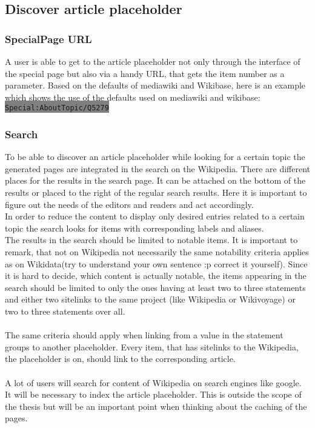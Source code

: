\documentclass[11pt]{article}
\begin{document}
  \subsection{Discover article placeholder}
  \subsubsection{SpecialPage URL}
  A user is able to get to the article placeholder not only through the interface of the special page but also via a handy URL, that gets the item number as a parameter. Based on the defaults of mediawiki and Wikibase, here is an example which shows the use of the defaults used on mediawiki and wikibase: \colorbox{Gray}{\lstinline[basicstyle=\ttfamily\color{white}]|Special:AboutTopic/Q5279|} \\

  \subsubsection{Search}
  To be able to discover an article placeholder while looking for a certain topic the generated pages are integrated in the search on the Wikipedia. There are different places for the results in the search page. It can be attached on the bottom of the results or placed to the right of the regular search results. Here it is important to figure out the needs of the editors and readers and act accordingly. \\
  In order to reduce the content to display only desired entries related to a certain topic the search looks for items with corresponding labels and aliases. \\
  The results in the search should be limited to notable items. It is important to remark, that not on Wikipedia not necessarily the same notability criteria applies as on Wikidata(try to understand your own sentence :p correct it yourself). Since it is hard to decide, which content is actually notable, the items appearing in the search should be limited to only the ones having at least two to three statements and either two sitelinks to the same project (like Wikipedia or Wikivoyage) or two to three statements over all. \\
  \\
  The same criteria should apply when linking from a value in the statement groups to another placeholder. Every item, that has sitelinks to the Wikipedia, the placeholder is on, should link to the corresponding article.  \\
  \\
  A lot of users will search for content of Wikipedia on search engines like google. It will be necessary to index the article placeholder. This is outside the scope of the thesis but will be an important point when thinking about the caching of the pages. 
\end{document}
